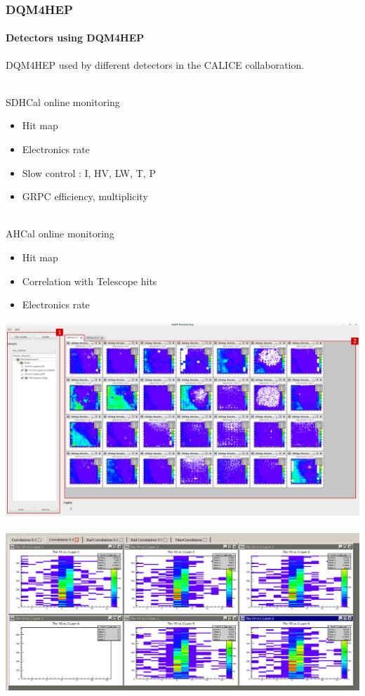 \documentclass[presentation, 10pt]{beamer}
\begin{document}
\begin{frame}
  \frametitle{DQM4HEP}
  \framesubtitle{Detectors using DQM4HEP}
  DQM4HEP used by different detectors in the CALICE collaboration. \\
  ~\\
  
  \begin{minipage}{0.49\linewidth}
    SDHCal online monitoring
    \begin{itemize}
      \item Hit map
      \item Electronics rate
      \item Slow control : I, HV, LW, T, P
      \item GRPC efficiency, multiplicity
    \end{itemize}
    ~\\
    AHCal online monitoring
    \begin{itemize}
      \item Hit map
      \item Correlation with Telescope hits
      \item Electronics rate
    \end{itemize}
  \end{minipage}
  \begin{minipage}{0.49\linewidth}
    \includegraphics[width=0.95\linewidth]{figs/MonitoringMainWindowGui.pdf} \\
    ~\\
    \includegraphics[width=0.95\linewidth]{figs/AHCal_DQM4HEP_CorrelationsYJ.png}
  \end{minipage}
\end{frame}
\end{document}
